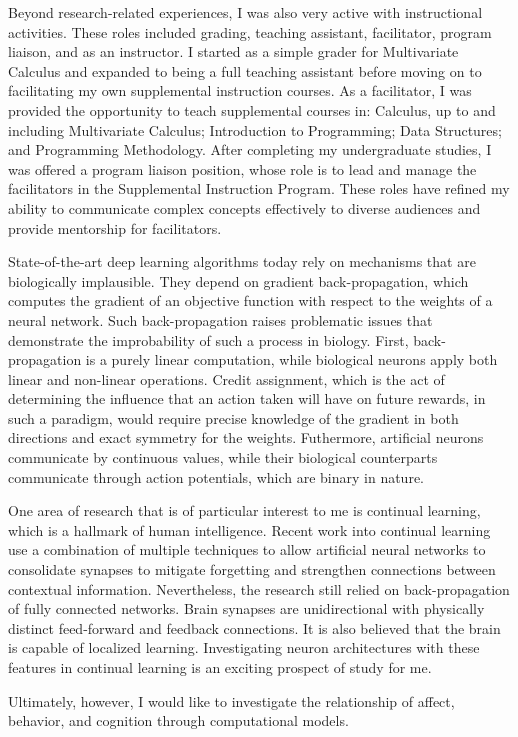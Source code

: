 \documentclass[12pt]{article}
\begin{document}
Beyond research-related experiences, I was also very active with instructional activities.  These roles included grading, teaching
assistant, facilitator, program liaison, and as an instructor.  I started as a simple grader for Multivariate Calculus and expanded to being
a full teaching assistant before moving on to facilitating my own supplemental instruction courses.  As a facilitator, I was provided the
opportunity to teach supplemental courses in: Calculus, up to and including Multivariate Calculus; Introduction to Programming; Data
Structures; and Programming Methodology.  After completing my undergraduate studies, I was offered a program liaison position, whose role
is to lead and manage the facilitators in the Supplemental Instruction Program.  These roles have refined my ability to communicate complex
concepts effectively to diverse audiences and provide mentorship for facilitators.

State-of-the-art deep learning algorithms today rely on mechanisms that are
biologically implausible.  They depend on gradient back-propagation, which
computes the gradient of an objective function with respect to the weights of a
neural network.  Such back-propagation raises problematic issues that
demonstrate the improbability of such a process in biology.  First,
back-propagation is a purely linear computation, while biological neurons apply
both linear and non-linear operations. Credit assignment, which is the act of
determining the influence that an action taken will have on future rewards, in
such a paradigm, would require precise knowledge of the gradient in both
directions and exact symmetry for the weights.  Futhermore, artificial neurons
communicate by continuous values, while their biological counterparts
communicate through action potentials, which are binary in nature.  

One
area of research that is of particular interest to me is continual learning, which is a
hallmark of human intelligence.  Recent work into continual learning use a
combination of multiple techniques to allow artificial neural networks to
consolidate synapses to mitigate forgetting and strengthen connections between
contextual information.  Nevertheless, the research still relied on
back-propagation of fully connected networks.  Brain synapses are unidirectional
with physically distinct feed-forward and feedback connections. It is also
believed that the brain is capable of localized learning. Investigating neuron
architectures with these features in continual learning is an exciting prospect
of study for me.

Ultimately, however, I would like to investigate the relationship of affect, behavior, and cognition through computational models.
\end{document}
